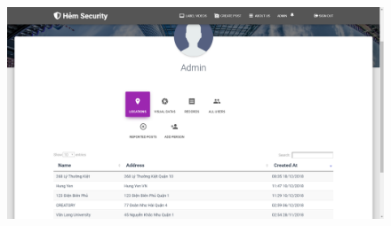 \begin{figure}[!htb]
\endminipage\hfill
{}
  \includegraphics[width=\linewidth]{images/chap4/admin.png}
\endminipage
\end{figure}
